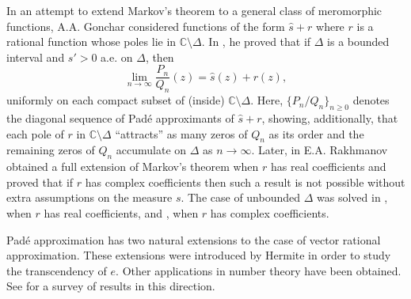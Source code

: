 \documentclass[10pt,a4paper]{article}
\theoremstyle{definition}
\theoremstyle{remark}
\numberwithin{equation}{section}
\begin{document}
In an attempt to extend Markov's theorem to a general class of meromorphic functions, A.A. Gonchar considered functions of the form $\widehat{s} + r$ where $r$ is a rational function whose poles lie in $\mathbb{C} \setminus \Delta$. In \cite{Gon0}, he proved that if  $\Delta$ is a bounded interval and $s' > 0$ a.e. on $\Delta$, then
\begin{equation} \label{MS} \lim_{n\to \infty} \frac{P_n}{Q_n}(z) = \widehat{s}(z)+r(z),
\end{equation}
uniformly on each compact subset of (inside) $\mathbb{C} \setminus \Delta$. Here, $\{P_n/Q_n\}_{n\geq 0}$ denotes the diagonal sequence of Pad\'e approximants of $\widehat{s}+r$, showing, additionally, that each pole of $r$ in $\mathbb{C} \setminus \Delta$ ``attracts'' as many zeros of $Q_n$ as its order and the remaining zeros of $Q_n$ accumulate on $\Delta$ as $n \to \infty$. Later, in \cite{Rak1} E.A. Rakhmanov obtained a full extension of Markov's theorem when $r$ has real coefficients and proved that if $r$ has complex coefficients then such a result is not possible  without extra assumptions on the measure $s$. The case of unbounded $\Delta$ was solved in \cite{L1}, when $r$ has real coefficients, and \cite{L2}, when $r$ has complex coefficients.


Pad\'e  approximation has two natural extensions to the case of vector rational approximation.  These extensions  were introduced by Hermite in order to study the transcendency of $e$. Other applications in number theory have been obtained. See \cite{Ass} for a survey of results in this direction.
\end{document}

